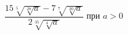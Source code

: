 \begin{ex}
	\begin{condition}
		\( \dfrac{15\sqrt[5]{\sqrt[28]{a}}-7\sqrt[7]{\sqrt[20]{a}}}{2\sqrt[35]{\sqrt[4]{a}}} \) при \( a>0 \)
	\end{condition}
\end{ex}